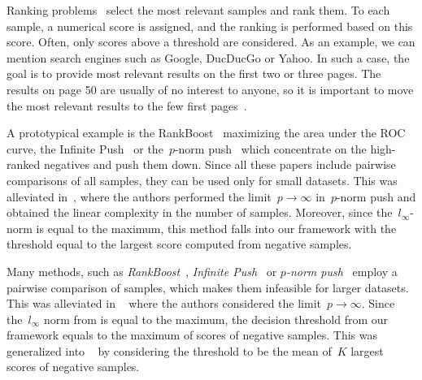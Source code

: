 Ranking problems~\cite{freund2003efficient, agarwal2011infinite, rudin2009pnorm, li2014top} select the most relevant samples and rank them. To each sample, a numerical score is assigned, and the ranking is performed based on this score. Often, only scores above a threshold are considered. As an example, we can mention search engines such as Google, DucDucGo or Yahoo. In such a case, the goal is to provide most relevant results on the first two or three pages. The results on page 50 are usually of no interest to anyone, so it is important to move the most relevant results to the few first pages~\cite{cortes2003auc}.







A prototypical example is the RankBoost~\cite{freund2003efficient} maximizing the area under the ROC curve, the Infinite Push~\cite{agarwal2011infinite} or the~$p$-norm push~\cite{rudin2009pnorm} which concentrate on the high-ranked negatives and push them down. Since all these papers include pairwise comparisons of all samples, they can be used only for small datasets. This was alleviated in~\cite{li2014top}, where the authors performed the limit~$p \to \infty$ in~$p$-norm push and obtained the linear complexity in the number of samples. Moreover, since the~$l_{\infty}$-norm is equal to the maximum, this method falls into our framework with the threshold equal to the largest score computed from negative samples.

Many methods, such as \emph{RankBoost}~\cite{freund2003efficient}, \emph{Infinite Push}~\cite{agarwal2011infinite} or \emph{$p$-norm push}~\cite{rudin2009pnorm} employ a pairwise comparison of samples, which makes them infeasible for larger datasets. This was alleviated in \TopPush~\cite{li2014top} where the authors considered the limit~$p \rightarrow \infty$. Since the~$l_{\infty}$ norm from \TopPush is equal to the maximum, the decision threshold from our framework equals to the maximum of scores of negative samples. This was generalized into \TopPushK~\cite{adam2019patmat} by considering the threshold to be the mean of~$K$ largest scores of negative samples.